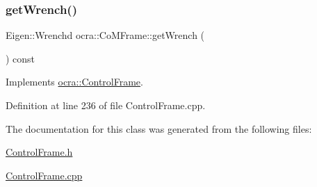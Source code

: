 \hypertarget{classocra_1_1CoMFrame_a8e00462bbe13df6f595b7000d44240c6}{}\label{classocra_1_1CoMFrame_a8e00462bbe13df6f595b7000d44240c6} 
\subsubsection{\texorpdfstring{get\+Wrench()}{getWrench()}}
{\footnotesize\ttfamily Eigen\+::\+Wrenchd ocra\+::\+Co\+M\+Frame\+::get\+Wrench (\begin{DoxyParamCaption}{ }\end{DoxyParamCaption}) const\hspace{0.3cm}{\ttfamily [virtual]}}



Implements \hyperlink{classocra_1_1ControlFrame_a069aaf1eab98598fbffee263fcde0c56}{ocra\+::\+Control\+Frame}.



Definition at line 236 of file Control\+Frame.\+cpp.



The documentation for this class was generated from the following files\+:\begin{DoxyCompactItemize}
\item 
\hyperlink{ControlFrame_8h}{Control\+Frame.\+h}\item 
\hyperlink{ControlFrame_8cpp}{Control\+Frame.\+cpp}\end{DoxyCompactItemize}
